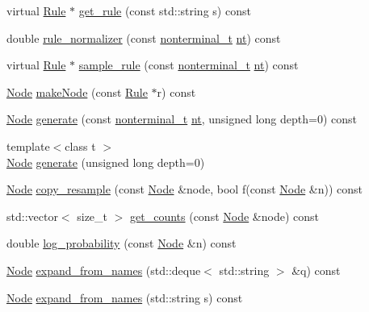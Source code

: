 \begin{DoxyCompactItemize}
\item 
virtual \hyperlink{class_rule}{Rule} $\ast$ \hyperlink{class_grammar_a1a48e2e6b4757c3398c60a20d759d307}{get\+\_\+rule} (const std\+::string s) const
\item 
double \hyperlink{class_grammar_a240019987945a694e26bebcebcf463fc}{rule\+\_\+normalizer} (const \hyperlink{_nonterminal_8h_a5c1f658dc7560600a16d22408bd716ca}{nonterminal\+\_\+t} \hyperlink{class_grammar_a047b55bfbd87c52e9d969af62c2932ab}{nt}) const
\item 
virtual \hyperlink{class_rule}{Rule} $\ast$ \hyperlink{class_grammar_aba4d092714b8420d8c0a1be63e8566b6}{sample\+\_\+rule} (const \hyperlink{_nonterminal_8h_a5c1f658dc7560600a16d22408bd716ca}{nonterminal\+\_\+t} \hyperlink{class_grammar_a047b55bfbd87c52e9d969af62c2932ab}{nt}) const
\item 
\hyperlink{class_node}{Node} \hyperlink{class_grammar_abc6f2a046bdf8df0be45912b5d8fe410}{make\+Node} (const \hyperlink{class_rule}{Rule} $\ast$r) const
\item 
\hyperlink{class_node}{Node} \hyperlink{class_grammar_af5dee7ec88bdd66edd023b3c935d2765}{generate} (const \hyperlink{_nonterminal_8h_a5c1f658dc7560600a16d22408bd716ca}{nonterminal\+\_\+t} \hyperlink{class_grammar_a047b55bfbd87c52e9d969af62c2932ab}{nt}, unsigned long depth=0) const
\item 
{\footnotesize template$<$class t $>$ }\\\hyperlink{class_node}{Node} \hyperlink{class_grammar_a01bf556e22bfdd5ec87868869fd9330f}{generate} (unsigned long depth=0)
\item 
\hyperlink{class_node}{Node} \hyperlink{class_grammar_a28b35de7e71ac8f451cd3a65818fc1db}{copy\+\_\+resample} (const \hyperlink{class_node}{Node} \&node, bool f(const \hyperlink{class_node}{Node} \&n)) const
\item 
std\+::vector$<$ size\+\_\+t $>$ \hyperlink{class_grammar_a1e192e96e623cf9beb927cbd35bd7470}{get\+\_\+counts} (const \hyperlink{class_node}{Node} \&node) const
\item 
double \hyperlink{class_grammar_a4b19c0b8d0b4d792181ae47bd2f68268}{log\+\_\+probability} (const \hyperlink{class_node}{Node} \&n) const
\item 
\hyperlink{class_node}{Node} \hyperlink{class_grammar_aef582b15696b97c3376cba935a76acef}{expand\+\_\+from\+\_\+names} (std\+::deque$<$ std\+::string $>$ \&q) const
\item 
\hyperlink{class_node}{Node} \hyperlink{class_grammar_a53a651b1fb2cad39efc4717b635b922e}{expand\+\_\+from\+\_\+names} (std\+::string s) const

\end{DoxyCompactItemize}
